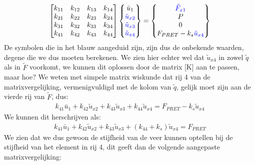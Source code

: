 \documentclass[a4paper,11pt,twoside]{report}
\begin{document}
\begin{align*}
    \begin{bmatrix}
        k_{11} & k_{12} & k_{13} & k_{14} \\
        k_{21} & k_{22} & k_{23} & k_{24} \\
        k_{31} & k_{32} & k_{33} & k_{34} \\
        k_{41} & k_{42} & k_{43} & k_{44}
    \end{bmatrix}
    \begin{Bmatrix}
        \bar{u}_1                    \\
        {\color{blue}\tilde{u}_{x2}} \\
        {\color{blue}\tilde{u}_{x3}} \\
        {\color{blue}\tilde{u}_{x4}}
    \end{Bmatrix} =
    \begin{Bmatrix}
        {\color{blue}\tilde{F}_{x1}} \\
        P                            \\
        0                            \\
        F_{PRET} - k_s {\color{blue}\tilde{u}_{x4}}
    \end{Bmatrix}
\end{align*}
De symbolen die in het blauw aangeduid zijn, zijn dus de onbekende waarden, degene die we dus moeten
berekenen. We zien hier echter wel dat $\tilde{u}_{x4}$ in zowel $\tilde{q}$ als in $\tilde{F}$
voorkomt, we kunnen dit oplossen door de matrix [K] aan te passen, maar hoe?
\newline
We weten met simpele matrix wiskunde dat rij 4 van de matrixvergelijking, vermenigvuldigd met de
kolom van $\tilde{q}$, gelijk moet zijn aan de vierde rij van $\tilde{F}$, dus:
\begin{align*}
    k_{41} \bar{u}_1 + k_{42} \tilde{u}_{x2} + k_{43} \tilde{u}_{x3} + k_{44} \tilde{u}_{x4} = F_{PRET} - k_s \tilde{u}_{x4}
\end{align*}
We kunnen dit herschrijven als:
\begin{align*}
    k_{41} \bar{u}_1 + k_{42} \tilde{u}_{x2} + k_{43} \tilde{u}_{x3} + (k_{44} + k_s) \tilde{u}_{x4} = F_{PRET}
\end{align*}
We zien dat we dus gewoon de stijfheid van de veer kunnen optellen bij de stijfheid van het element
in rij 4, dit geeft dan de volgende aangepaste matrixvergelijking:
\end{document}
